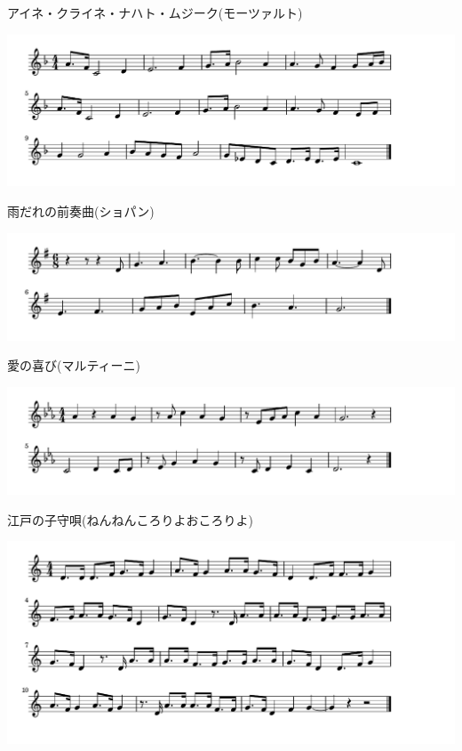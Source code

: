 \documentclass[a4paper]{ltjsarticle}
\begin{document}
\vspace{-10mm} \hspace{10mm}
アイネ・クライネ・ナハト・ムジーク(モーツァルト)

\includegraphics[clip]{amadare_crop.pdf}

\vspace{-10mm} \hspace{10mm}
雨だれの前奏曲(ショパン)

\includegraphics[clip]{ainoyorokobi_crop.pdf}

\vspace{-10mm} \hspace{10mm}
愛の喜び(マルティーニ)

\includegraphics[clip]{edokomori_crop.pdf}

\vspace{-10mm} \hspace{10mm}
江戸の子守唄(ねんねんころりよおころりよ)

\includegraphics[clip]{antagata_crop.pdf}
\end{document}
